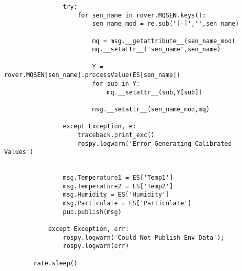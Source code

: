 \begin{verbatim}
                try:
                    for sen_name in rover.MQSEN.keys():
                        sen_name_mod = re.sub('[-]','',sen_name)

                        mq = msg.__getattribute__(sen_name_mod)
                        mq.__setattr__('sen_name',sen_name)

                        Y = rover.MQSEN[sen_name].processValue(ES[sen_name])
                        for sub in Y:
                            mq.__setattr__(sub,Y[sub])

                        msg.__setattr__(sen_name_mod,mq)

                except Exception, e:
                    traceback.print_exc()
                    rospy.logwarn('Error Generating Calibrated Values')
                    

                msg.Temperature1 = ES['Temp1']
                msg.Temperature2 = ES['Temp2']
                msg.Humidity = ES['Humidity']
                msg.Particulate = ES['Particulate']
                pub.publish(msg)

            except Exception, err:
                rospy.logwarn('Could Not Publish Env Data');
                rospy.logwarn(err)

        rate.sleep()
\end{verbatim}


